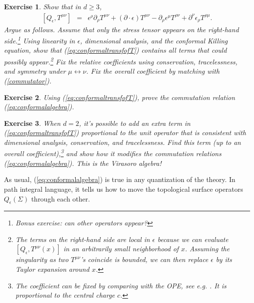 \documentclass{ws-rv9x6}
\newcommand\be{\begin{eqnarray}}
\newcommand\ee{\end{eqnarray}}
\newcommand\ptl\partial
\newcommand\e\epsilon
\newcommand\<\langle
\renewcommand\>\rangle
\renewcommand\.{\cdot}
\newtheorem{exercise}{Exercise}[section]
\begin{document}
\begin{exercise}
Show that in $d\geq 3$,
\be
\label{eq:conformaltransfofT}
[Q_\e,T^{\mu\nu}] &=& \e^\rho\ptl_\rho T^{\mu\nu}+(\ptl\.\e)T^{\mu\nu}-\ptl_\rho \e^\mu T^{\rho\nu}+\ptl^\nu\e_\rho T^{\rho\mu}.
\ee
Argue as follows. Assume that only the stress tensor appears on the right-hand side.\footnote{Bonus exercise: can other operators appear?} Using linearity in $\e$, dimensional analysis, and the conformal Killing equation, show that (\ref{eq:conformaltransfofT}) contains all terms that could possibly appear.\footnote{The terms on the right-hand side are local in $\e$ because we can evaluate $[Q_{\e},T^{\mu\nu}(x)]$ in an arbitrarily small neighborhood of $x$. Assuming the singularity as two $T^{\mu\nu}$'s coincide is bounded, we can then replace $\e$ by its Taylor expansion around $x$.}  Fix the relative coefficients using conservation, tracelessness, and symmetry under $\mu\leftrightarrow \nu$. Fix the overall coefficient by matching with (\ref{commutator}).
\end{exercise}

\begin{exercise}
Using (\ref{eq:conformaltransfofT}), prove the commutation relation (\ref{eq:conformalalgebra}).
\end{exercise}

\begin{exercise}
When $d=2$, it's possible to add an extra term in (\ref{eq:conformaltransfofT}) proportional to the unit operator that is consistent with dimensional analysis, conservation, and tracelessness.  Find this term (up to an overall coefficient),\footnote{The coefficient can be fixed by comparing with the OPE, see e.g. \cite{Polchinski:1998rq}. It is proportional to the central charge $c$.} and show how it modifies the commutation relations (\ref{eq:conformalalgebra}). This is the Virasoro algebra!
\end{exercise}

As usual, (\ref{eq:conformalalgebra}) is true in any quantization of the theory.  In path integral language, it tells us how to move the topological surface operators $Q_{\e}(\Sigma)$ through each other.
\end{document}
